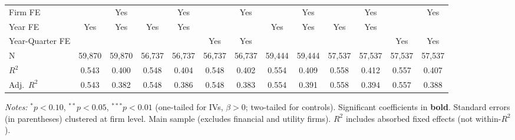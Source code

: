\begin{landscape}
\begin{table}[H]
\begin{tabular}{lcccccccccccc}
Firm FE &  & Yes &  & Yes &  & Yes &  & Yes &  & Yes &  & Yes \\
Year FE & Yes & Yes & Yes & Yes &  &  & Yes & Yes & Yes & Yes &  &  \\
Year-Quarter FE &  &  &  &  & Yes & Yes &  &  &  &  & Yes & Yes \\
\midrule
N & 59,870 & 59,870 & 56,737 & 56,737 & 56,737 & 56,737 & 59,444 & 59,444 & 57,537 & 57,537 & 57,537 & 57,537 \\
$R^2$ & 0.543 & 0.400 & 0.548 & 0.404 & 0.548 & 0.402 & 0.554 & 0.409 & 0.558 & 0.412 & 0.557 & 0.407 \\
Adj.~$R^2$ & 0.543 & 0.382 & 0.548 & 0.386 & 0.548 & 0.383 & 0.554 & 0.391 & 0.558 & 0.394 & 0.557 & 0.388 \\
\bottomrule
\end{tabular}
\begin{minipage}{\linewidth}
\vspace{2pt}\scriptsize
\textit{Notes:} $^{*}p<0.10$, $^{**}p<0.05$, $^{***}p<0.01$ (one-tailed for IVs, $\beta > 0$; two-tailed for controls).
 Significant coefficients in \textbf{bold}.
 Standard errors (in parentheses) clustered at firm level.
 Main sample (excludes financial and utility firms).
 $R^2$ includes absorbed fixed effects (not within-$R^2$).
\end{minipage}
\end{table}
\end{landscape}